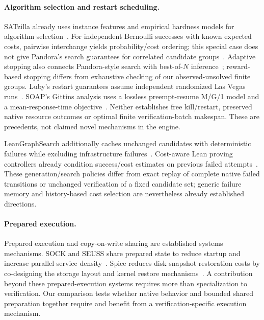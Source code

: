 \documentclass[10pt,twocolumn]{article}
\begin{document}
\paragraph{Algorithm selection and restart scheduling.}
SATzilla already uses instance features and empirical hardness models for
algorithm selection~\cite{satzilla2008}.
For independent Bernoulli successes with known expected costs, pairwise
interchange yields probability/cost ordering; this special case does not give
Pandora's search guarantees for correlated candidate groups~\cite{weitzmanSearch}.
Adaptive stopping also connects Pandora-style search with best-of-$N$
inference~\cite{optimalStoppingBon2025}; reward-based stopping differs from
exhaustive checking of our observed-unsolved finite groups.
Luby's restart guarantees assume independent randomized Las Vegas
runs~\cite{lubyRestart1993}. SOAP's Gittins analysis uses a lossless
preempt-resume M/G/1 model and a mean-response-time objective~\cite{soap2018}.
Neither establishes free kill/restart, preserved native resource outcomes or
optimal finite verification-batch makespan. These are precedents, not claimed
novel mechanisms in the engine.


LeanGraphSearch additionally caches unchanged candidates with deterministic
failures while excluding infrastructure failures~\cite{leanGraphSearch2026}.
Cost-aware Lean proving controllers already condition success/cost estimates
on previous failed attempts~\cite{leanCostQuality2026}. These generation/search
policies differ from exact replay of complete native failed transitions or
unchanged verification of a fixed candidate set; generic failure memory and
history-based cost selection are nevertheless already established directions.

\paragraph{Prepared execution.}
Prepared execution and copy-on-write sharing are established systems mechanisms. SOCK and SEUSS share prepared state to reduce startup and increase parallel service density~\cite{sock,seuss}. Spice reduces disk snapshot restoration costs by co-designing the storage layout and kernel restore mechanisms~\cite{spice}. A contribution beyond these prepared-execution systems requires more than specialization to verification. Our comparison tests whether native behavior and bounded shared preparation together require and benefit from a verification-specific execution mechanism.
\end{document}
